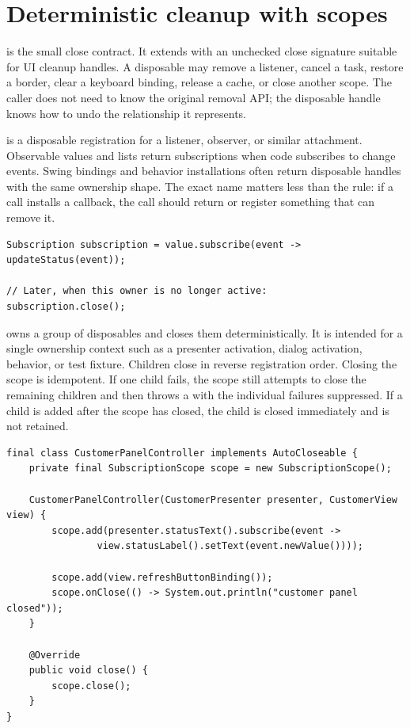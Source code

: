 \section{Deterministic cleanup with scopes}

 is the small close contract. It extends
 with an unchecked close signature suitable for UI cleanup
handles. A disposable may remove a listener, cancel a task, restore a border,
clear a keyboard binding, release a cache, or close another scope. The caller
does not need to know the original removal API; the disposable handle knows how
to undo the relationship it represents.

 is a disposable registration for a listener,
observer, or similar attachment. Observable values and lists return
subscriptions when code subscribes to change events. Swing bindings and
behavior installations often return disposable handles with the same ownership
shape. The exact name matters less than the rule: if a call installs a callback,
the call should return or register something that can remove it.

\begin{lstlisting}[caption={A subscription is a cleanup handle.}]
Subscription subscription = value.subscribe(event -> updateStatus(event));

// Later, when this owner is no longer active:
subscription.close();
\end{lstlisting}

 owns a group of disposables and closes them
deterministically. It is intended for a single ownership context such as a
presenter activation, dialog activation, behavior, or test fixture. Children
close in reverse registration order. Closing the scope is idempotent. If one
child fails, the scope still attempts to close the remaining children and then
throws a  with the individual failures
suppressed. If a child is added after the scope has closed, the child is closed
immediately and is not retained.

\begin{lstlisting}[caption={A screen activation owns one cleanup scope.}]
final class CustomerPanelController implements AutoCloseable {
    private final SubscriptionScope scope = new SubscriptionScope();

    CustomerPanelController(CustomerPresenter presenter, CustomerView view) {
        scope.add(presenter.statusText().subscribe(event ->
                view.statusLabel().setText(event.newValue())));

        scope.add(view.refreshButtonBinding());
        scope.onClose(() -> System.out.println("customer panel closed"));
    }

    @Override
    public void close() {
        scope.close();
    }
}
\end{lstlisting}

